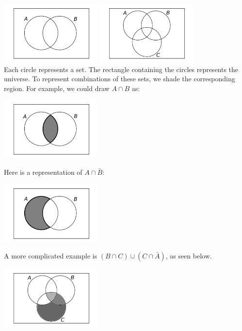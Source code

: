 \includegraphics[width=2in]{pictures/venn2blank.png} \hfill \includegraphics[width=2in]{pictures/venn3blank.png}\\

Each circle represents a set.  The rectangle containing the circles represents the universe.  To represent combinations of these sets, we shade the corresponding region.  For example, we could draw $A \cap B$ as:

\begin{center}
  \includegraphics[width=2in]{pictures/venn2AcapB.png} 
\end{center}

Here is a representation of $A \cap \bar B$:

\begin{center}
 \includegraphics[width=2in]{pictures/venn2AcapbarB.png}
\end{center}



A more complicated example is $(B \cap C) \cup (C \cap \bar A)$, as seen below.

\begin{center}
 \includegraphics[width=2in]{pictures/venn3complex.png}
\end{center}

